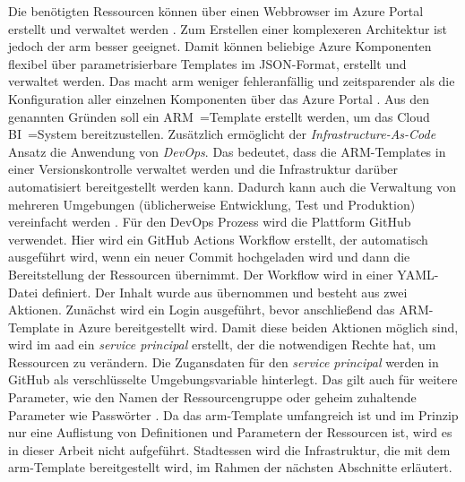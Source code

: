 Die benötigten Ressourcen können über einen Webbrowser im Azure Portal erstellt und verwaltet werden \cite{chilberto_building_2020}. Zum Erstellen einer komplexeren Architektur ist jedoch der \ac{arm} besser geeignet. Damit können beliebige Azure Komponenten flexibel über parametrisierbare Templates im JSON-Format, erstellt und verwaltet werden. Das macht \ac{arm} weniger fehleranfällig und zeitsparender als die Konfiguration aller einzelnen Komponenten über das Azure Portal \cite{monadjemi_azure-administration_2017}. Aus den genannten Gründen soll ein ARM~=Template erstellt werden, um das Cloud BI~=System bereitzustellen. Zusätzlich ermöglicht der \textit{Infrastructure-As-Code} Ansatz die Anwendung von \textit{DevOps}. Das bedeutet, dass die ARM-Templates in einer Versionskontrolle verwaltet werden und die Infrastruktur darüber automatisiert bereitgestellt werden kann. Dadurch kann auch die Verwaltung von mehreren Umgebungen (üblicherweise Entwicklung, Test und Produktion) vereinfacht werden \cite{riscutia_data_2021}. Für den DevOps Prozess wird die Plattform GitHub verwendet. Hier wird ein GitHub Actions Workflow erstellt, der automatisch ausgeführt wird, wenn ein neuer Commit hochgeladen wird und dann die Bereitstellung der Ressourcen übernimmt. Der Workflow wird in einer YAML-Datei definiert. Der Inhalt wurde aus  übernommen und besteht aus zwei Aktionen. Zunächst wird ein Login ausgeführt, bevor anschließend das ARM-Template in Azure bereitgestellt wird. Damit diese beiden Aktionen möglich sind, wird im \ac{aad} ein \textit{service principal} erstellt, der die notwendigen Rechte hat, um Ressourcen zu verändern. Die Zugansdaten für den \textit{service principal} werden in GitHub als verschlüsselte Umgebungsvariable hinterlegt. Das gilt auch für weitere Parameter, wie den Namen der Ressourcengruppe oder geheim zuhaltende Parameter wie Passwörter \cite[vgl.][]{rendon_deploy_2022}. Da das \ac{arm}-Template umfangreich ist und im Prinzip nur eine Auflistung von Definitionen und Parametern der Ressourcen ist, wird es in dieser Arbeit nicht aufgeführt. Stadtessen wird die Infrastruktur, die mit dem \ac{arm}-Template bereitgestellt wird, im Rahmen der nächsten Abschnitte erläutert.

